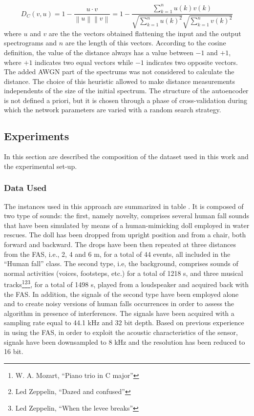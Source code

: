 \begin{equation}
D_C(v,u)=1-\frac{u\cdot v}{\left\|u \right\|\left\|v \right\| }= 1- \frac{\sum_{k=1}^{n}u(k)v(k)}{\sqrt{\sum_{k=1}^{n}u(k)^2}\sqrt{\sum_{k=1}^{n}v(k)^2}}
\end{equation}
where $u$ and $v$ are the the vectors obtained flattening the input and the output spectrograms and $n$ are the length of this vectors. 
According to the cosine definition, the value of the distance always has a value between $-1$ and $+1$, where $+1$ indicates two equal vectors while $-1$ indicates two opposite vectors.
The added AWGN part of the spectrums was not considered to calculate the distance. The choice of this heuristic allowed to make distance measurements independents of the size of the initial spectrum.
The structure of the autoencoder is not defined a priori, but it is chosen through a phase of cross-validation during which the network parameters are varied with a random search strategy.

\subsection{Experiments}
\label{sec:endtoend_experiments}
In this section are described the composition of the dataset used in this work and the experimental set-up.

\subsubsection{Data Used} 

The instances used in this approach are summarized in table .
It is composed of two type of sounds: the first, namely novelty, comprises several human fall sounds that have been simulated by means of a human-mimicking doll employed in water rescues. The doll has been dropped from upright position and from a chair, both forward and backward. The drops have been then repeated at three distances from the FAS, i.e., 2, 4 and 6 m, for a total of 44 events, all included in the “Human fall” class. The second type, i.e, the background, comprises sounds of normal activities (voices, footsteps, etc.) for a total of 1218 s, and three musical tracks\footnote{W. A. Mozart, ``Piano trio in C major''}\footnote{Led Zeppelin, ``Dazed and confused''}\footnote{Led Zeppelin, ``When the levee breaks''}, for a total of 1498 s, played from a loudspeaker and acquired back with the FAS.
In addition, the signals of the second type have been employed alone and to create noisy versions of human falls occurrences in order to assess the algorithm in presence of interferences.
The signals have been acquired with a sampling rate equal to 44.1 kHz and 32 bit depth. Based on previous experience in using the FAS, in order to exploit the acoustic characteristics of the sensor, signals have been downsampled to 8 kHz and the resolution has been reduced to 16 bit.



